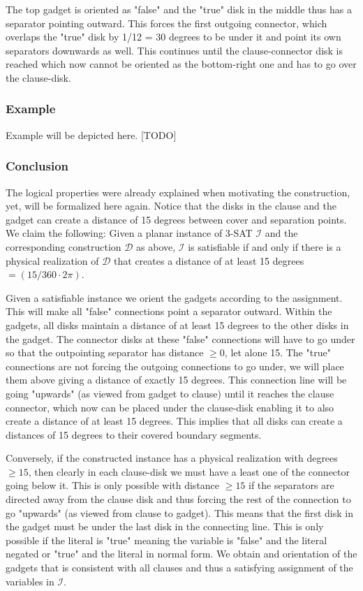 \documentclass[a4paper,11pt]{article}
\begin{document}
The top gadget is oriented as "false" and the "true" disk in the middle thus has a separator pointing outward. This forces the first outgoing connector, which overlaps the "true" disk by 1/12 = 30 degrees to be under it and point its own separators downwards as well. This continues until the clause-connector disk is reached which now cannot be oriented as the bottom-right one and has to go over the clause-disk.

\subsubsection*{Example}
Example will be depicted here. [TODO]

\subsubsection*{Conclusion}
The logical properties were already explained when motivating the construction, yet, will be formalized here again. Notice that the disks in the clause and the gadget can create a distance of 15 degrees between cover and separation points. We claim the following:
Given a planar instance of 3-SAT $\mathcal{I}$ and the corresponding construction $\mathcal{D}$ as above, $\mathcal{I}$ is satisfiable if and only if there is a physical realization of $\mathcal{D}$ that creates a distance of at least 15 degrees $=(15/360\cdot 2\pi)$.

Given a satisfiable instance we orient the gadgets according to the assignment. This will make all "false" connections point a separator outward. Within the gadgets, all disks maintain a distance of at least 15 degrees to the other disks in the gadget. The connector disks at these "false" connections will have to go under so that the outpointing separator has distance $\geq 0$, let alone 15. The "true" connections are not forcing the outgoing connections to go under, we will place them above giving a distance of exactly 15 degrees. This connection line will be going "upwards" (as viewed from gadget to clause) until it reaches the clause connector, which now can be placed under the clause-disk enabling it to also create a distance of at least 15 degrees.
This implies that all disks can create a distances of 15 degrees to their covered boundary segments.

Conversely, if the constructed instance has a physical realization with degrees $\geq 15$, then clearly in each clause-disk we must have a least one of the connector going below it. This is only possible with distance $\geq 15$ if the separators are directed away from the clause disk and thus forcing the rest of the connection to go "upwards" (as viewed from clause to gadget). This means that the first disk in the gadget must be under the last disk in the connecting line. This is only possible if the literal is "true" meaning the variable is "false" and the literal negated or "true" and the literal in normal form. We obtain and orientation of the gadgets that is consistent with all clauses and thus a satisfying assignment of the variables in $\mathcal{I}$.\qedsymbol
\end{document}
